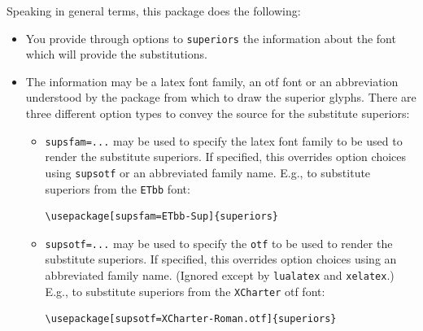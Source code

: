 \documentclass[11pt]{article}
\begin{document}
Speaking in general terms, this package does the following:
\begin{itemize}
\item You provide through options to {\tt superiors} the information about the font which will provide the substitutions. 
\item The information may be a latex font family, an otf font or an abbreviation understood by the package from which to draw the superior glyphs. There are three different option types to convey the source for the substitute superiors:
\begin{itemize}
\item
{\tt supsfam=...} may be used to specify the latex font family to be used to render the substitute superiors. If specified, this overrides option choices using {\tt supsotf} or an abbreviated family name. E.g., to substitute superiors from the {\tt ETbb} font:
\begin{verbatim}
\usepackage[supsfam=ETbb-Sup]{superiors}
\end{verbatim}

\item
{\tt supsotf=...} may be used to specify the {\tt otf} to be used to render the substitute superiors. If specified, this overrides option choices using an abbreviated family name. (Ignored except by {\tt lualatex} and {\tt xelatex}.) E.g., to substitute superiors from the {\tt XCharter} otf font:
\begin{verbatim}
\usepackage[supsotf=XCharter-Roman.otf]{superiors}
\end{verbatim}


\end{itemize}
\end{itemize}
\end{document}
